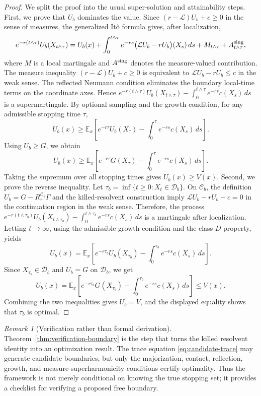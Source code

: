 \documentclass[pdflatex,sn-mathphys-num]{sn-jnl}
\theoremstyle{plain}
\theoremstyle{definition}
\theoremstyle{remark}
\newtheorem{remark}[theorem]{Remark}
\numberwithin{equation}{section}
\begin{document}
\begin{proof} 
We split the proof into the usual super-solution and attainability steps. First, we prove that \(U_b\) dominates the value. Since 
$(r-\mathcal L)U_b+c\ge0$ in the sense of measures, the generalized It\^{o} formula gives, after localization, 
\[
e^{-r(t\wedge\tau)}U_b(X_{t\wedge\tau}) = U_b(x) + \int_0^{t\wedge\tau} e^{-rs} \big(\mathcal L U_b-rU_b\big)(X_s)\,ds + M_{t\wedge\tau} + A_{t\wedge\tau}^{\rm sing},
\]
where \(M\) is a local martingale and \(A^{\rm sing}\) denotes the measure-valued contribution. The measure inequality 
$\displaystyle (r-\mathcal L)U_b+c\ge0$ 
is equivalent to  
$\displaystyle \mathcal L U_b-rU_b\le c $
in the weak sense. The reflected Neumann condition eliminates the boundary local-time terms on the coordinate axes. Hence 
$\displaystyle e^{-r(t\wedge\tau)}U_b(X_{t\wedge\tau}) - \int_0^{t\wedge\tau}e^{-rs}c(X_s)\,ds $
is a supermartingale. By optional sampling and the growth condition, for any admissible stopping time \(\tau\), 
\[ 
U_b(x) \ge \mathbb E_x \left[ e^{-r\tau}U_b(X_\tau) - \int_0^\tau e^{-rs}c(X_s)\,ds \right]. 
\] 
Using \(U_b\ge G\), we obtain 
\[ 
U_b(x) \ge \mathbb E_x \left[ e^{-r\tau}G(X_\tau) - \int_0^\tau e^{-rs}c(X_s)\,ds \right]. 
\] 
Taking the supremum over all stopping times gives 
$U_b(x)\ge V(x)$. 
Second, we prove the reverse inequality. Let 
$\tau_b=\inf\{t\ge0:X_t\in\mathcal D_b\}$. 
On \(\mathcal C_b\), the definition 
$U_b=G-R_r^{\mathcal C_b}\Gamma$ 
and the killed-resolvent construction imply 
$\mathcal L U_b-rU_b-c=0 $
in the continuation region in the weak sense. Therefore, the process 
$\displaystyle e^{-r(t\wedge\tau_b)}U_b(X_{t\wedge\tau_b}) - \int_0^{t\wedge\tau_b}e^{-rs}c(X_s)\,ds$ 
is a martingale after localization. Letting \(t\to\infty\), using the admissible growth condition and the class \(D\) property, yields 
\[ 
U_b(x) = \mathbb E_x \left[ e^{-r\tau_b}U_b(X_{\tau_b}) - \int_0^{\tau_b}e^{-rs}c(X_s)\,ds \right]. 
\] 
Since \(X_{\tau_b}\in\mathcal D_b\) and \(U_b=G\) on \(\mathcal D_b\), we get 
\[ 
U_b(x) = \mathbb E_x \left[ e^{-r\tau_b}G(X_{\tau_b}) - \int_0^{\tau_b}e^{-rs}c(X_s)\,ds \right] \le V(x). 
\] 
Combining the two inequalities gives \(U_b=V\), and the displayed equality shows that \(\tau_b\) is optimal. 
\end{proof} 

\begin{remark}[Verification rather than formal derivation] \label{rem:verification-not-formal} 
Theorem~\ref{thm:verification-boundary} is the step that turns the killed resolvent identity into an optimization result. The trace equation \eqref{eq:candidate-trace} may generate candidate boundaries, but only the majorization, contact, reflection, growth, and measure-superharmonicity conditions certify optimality. Thus the framework is not merely conditional on knowing the true stopping set; it provides a checklist for verifying a proposed free boundary. 
\end{remark} 
\end{document}
